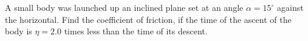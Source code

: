 
\item A small body was launched up an inclined plane set at an angle $\alpha = 15^\circ$ against the horizontal. Find the coefficient of friction, if the time of the ascent of the body is $\eta = 2.0$ times less than the time of its descent.
